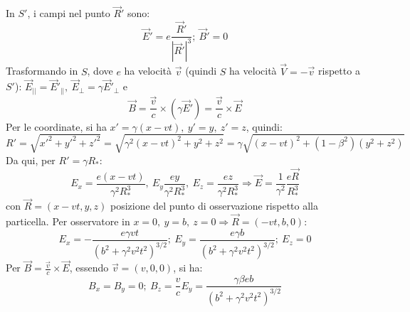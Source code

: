 \documentclass[10pt, a4paper]{scrartcl}
\numberwithin{equation}{subsection}
\theoremstyle{style1}
\begin{document}
In $S'$, i campi nel punto $\vec{R}'$ sono:
\begin{equation}
	\vec{E}' = e \frac{\vec{R}'}{|\vec{R}'|^3}; \ \vec{B}' = 0
\end{equation}
Trasformando in $S$, dove $e$ ha velocit\`a $\vec{v}$ (quindi $S$ ha velocit\`a $\vec{V}= -\vec{v}$ rispetto a $S'$): $\vec{E}_{| |} = \vec{E}'_{| |}, \ \vec{E}_\perp = \gamma\vec{E}'_\perp  $ e 
\begin{equation}
	\vec{B} = \frac{\vec{v}}{c}\times (\gamma\vec{E}') = \frac{\vec{v}}{c} \times \vec{E}
\end{equation}
Per le coordinate, si ha $x' = \gamma(x-vt) , \ y'=y ,\ z' =z$, quindi:
\[
R ' = \sqrt{x'^2 + y'^2 + z'^2}=\sqrt{\gamma^2(x-vt)^2 + y^2 + z^2} = \gamma \sqrt{(x-vt)^2 + (1-\beta ^2) (y^2 + z^2)}   
\] 
Da qui, per $R' = \gamma R_*$:
\begin{equation}
		E_x = \frac{e(x-vt)}{\gamma^2 R_*^3}, \ E_y \frac{ey}{\gamma^2 R_*^3}, \ E_z = \frac{ez}{\gamma^2 R_*^3}\Longrightarrow \vec{E}= \frac{1}{\gamma^2}\frac{e\vec{R}}{R_*^3}
\end{equation}
con $\vec{R} = (x-vt, y,z)$ posizione del punto di osservazione rispetto alla particella. Per osservatore in $x=0,\ y=b,\ z=0\Rightarrow \vec{R}=(-vt,b,0)$:
\begin{equation}
	E_x = - \frac{e\gamma vt}{(b^2 + \gamma^2 v^2 t^2)^{3 / 2} };\ E_y = \frac{e\gamma b}{(b^2+\gamma^2 v^2 t^2 ) ^{3 / 2} }; \ E_z = 0
\end{equation}
Per $\vec{B}= \frac{\vec{v}}{c} \times \vec{E}$, essendo $\vec{v}=(v,0,0)$, si ha:
\begin{equation}
	B_x = B_y = 0; \ B_z = \frac{v}{c}E_y = \frac{\gamma \beta  e b}{(b^2 + \gamma^2 v^2 t^2) ^{3 / 2} }
\end{equation}
\end{document}

